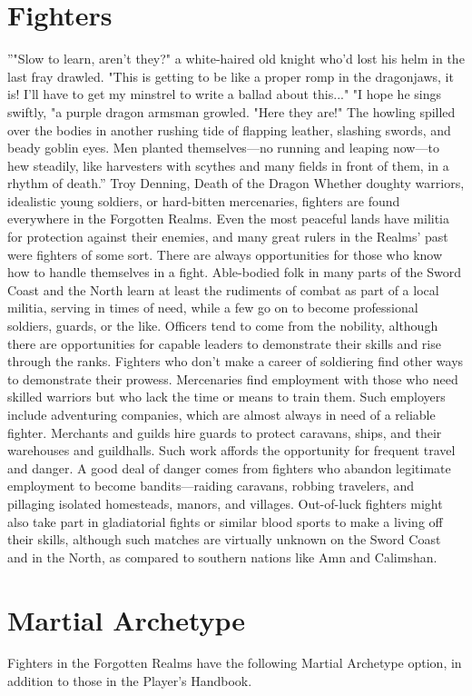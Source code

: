 \documentclass[10pt,a4paper,twoside,twocolumn,openany,bg=print,nodeprecatedcode]{dndbook}
\begin{document}
\section{Fighters}
\DndQuote%
{}
{''"Slow to learn, aren't they?" a white-haired old knight who'd lost his helm in the last fray drawled. "This is getting to be like a proper romp in the dragonjaws, it is! I'll have to get my minstrel to write a ballad about this..." "I hope he sings swiftly, "a purple dragon armsman growled. "Here they are!" The howling spilled over the bodies in another rushing tide of flapping leather, slashing swords, and beady goblin eyes. Men planted themselves—no running and leaping now—to hew steadily, like harvesters with scythes and many fields in front of them, in a rhythm of death.''}
{Troy Denning, Death of the Dragon}
Whether doughty warriors, idealistic young soldiers, or hard-bitten mercenaries, fighters are found everywhere in the Forgotten Realms. Even the most peaceful lands have militia for protection against their enemies, and many great rulers in the Realms' past were fighters of some sort. There are always opportunities for those who know how to handle themselves in a fight.
Able-bodied folk in many parts of the Sword Coast and the North learn at least the rudiments of combat as part of a local militia, serving in times of need, while a few go on to become professional soldiers, guards, or the like. Officers tend to come from the nobility, although there are opportunities for capable leaders to demonstrate their skills and rise through the ranks.
Fighters who don't make a career of soldiering find other ways to demonstrate their prowess. Mercenaries find employment with those who need skilled warriors but who lack the time or means to train them. Such employers include adventuring companies, which are almost always in need of a reliable fighter.
Merchants and guilds hire guards to protect caravans, ships, and their warehouses and guildhalls. Such work affords the opportunity for frequent travel and danger.
A good deal of danger comes from fighters who abandon legitimate employment to become bandits—raiding caravans, robbing travelers, and pillaging isolated homesteads, manors, and villages. Out-of-luck fighters might also take part in gladiatorial fights or similar blood sports to make a living off their skills, although such matches are virtually unknown on the Sword Coast and in the North, as compared to southern nations like Amn and Calimshan.
\section{Martial Archetype}
Fighters in the Forgotten Realms have the following Martial Archetype option, in addition to those in the Player's Handbook.
\end{document}
